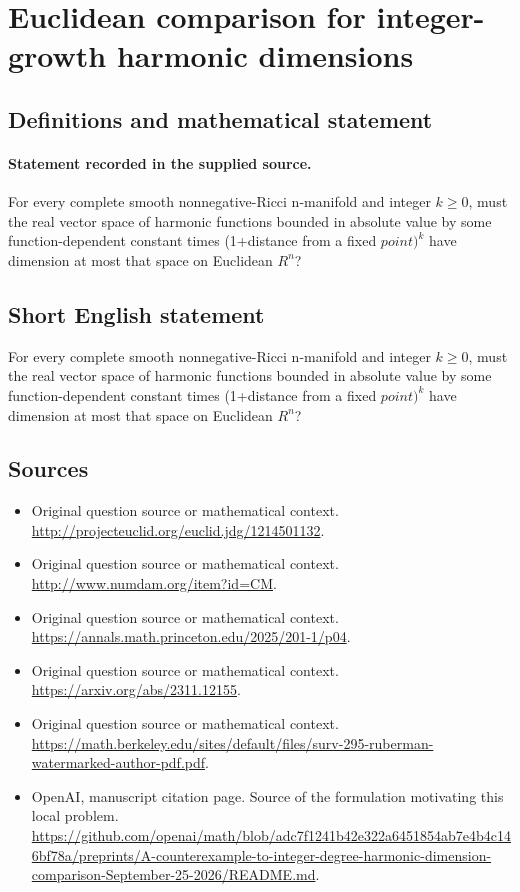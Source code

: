 \documentclass[11pt]{article}
\begin{document}
\section*{Euclidean comparison for integer-growth harmonic dimensions}\label{30007145}
\subsection{Definitions and mathematical statement}
\paragraph{Statement recorded in the supplied source.}
For every complete smooth nonnegative-Ricci n-manifold and integer $k\geq 0$, must the real vector space of harmonic functions bounded in absolute value by some function-dependent constant times (1+distance from a fixed $point)^k$ have dimension at most that space on Euclidean $R^{n}$?
\subsection{Short English statement}
For every complete smooth nonnegative-Ricci n-manifold and integer $k\geq 0$, must the real vector space of harmonic functions bounded in absolute value by some function-dependent constant times (1+distance from a fixed $point)^k$ have dimension at most that space on Euclidean $R^{n}$?
\subsection{Sources}
\begin{itemize}
\item[S1] Original question source or mathematical context.
\url{http://projecteuclid.org/euclid.jdg/1214501132}.
\item[S2] Original question source or mathematical context.
\url{http://www.numdam.org/item?id=CM}.
\item[S3] Original question source or mathematical context.
\url{https://annals.math.princeton.edu/2025/201-1/p04}.
\item[S4] Original question source or mathematical context.
\url{https://arxiv.org/abs/2311.12155}.
\item[S5] Original question source or mathematical context.
\url{https://math.berkeley.edu/sites/default/files/surv-295-ruberman-watermarked-author-pdf.pdf}.
\item[S6] OpenAI, manuscript citation page. Source of the formulation motivating this local problem.
\url{https://github.com/openai/math/blob/adc7f1241b42e322a6451854ab7e4b4c146bf78a/preprints/A-counterexample-to-integer-degree-harmonic-dimension-comparison-September-25-2026/README.md}.
\end{itemize}
\end{document}
